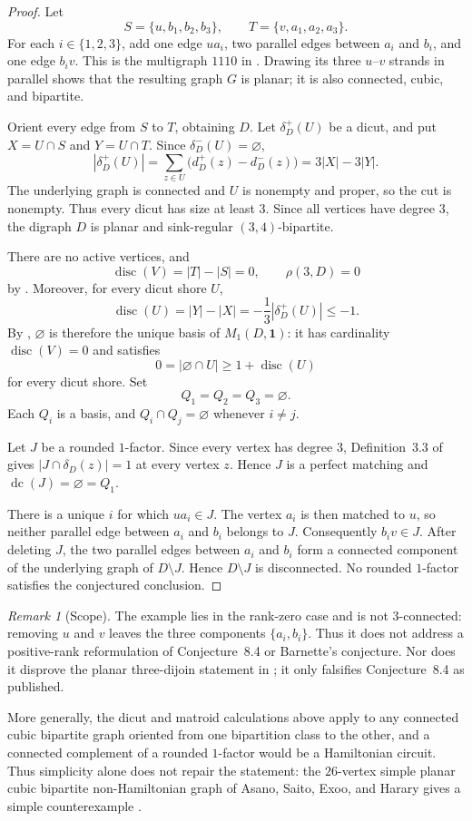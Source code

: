 \documentclass[11pt]{amsart}
\theoremstyle{remark}
\newtheorem{remark}[theorem]{Remark}
\newcommand{\disc}{\operatorname{disc}}
\newcommand{\dc}{\operatorname{dc}}
\begin{document}
\begin{proof}
Let
\[
 S=\{u,b_1,b_2,b_3\},
 \qquad
 T=\{v,a_1,a_2,a_3\}.
\]
For each $i\in\{1,2,3\}$, add one edge $ua_i$, two parallel edges
between $a_i$ and $b_i$, and one edge $b_iv$. This is the multigraph
$1110$ in \cite[Figure~3]{EH}. Drawing its three $u$--$v$ strands in
parallel shows that the resulting graph $G$ is planar; it is also
connected, cubic, and bipartite.

Orient every edge from $S$ to $T$, obtaining $D$. Let
$\delta_D^+(U)$ be a dicut, and put $X=U\cap S$ and $Y=U\cap T$.
Since $\delta_D^-(U)=\varnothing$,
\[
 |\delta_D^+(U)|
 =\sum_{z\in U}\bigl(d_D^+(z)-d_D^-(z)\bigr)
 =3|X|-3|Y|.
\]
The underlying graph is connected and $U$ is nonempty and proper, so
the cut is nonempty. Thus every dicut has size at least $3$. Since
all vertices have degree $3$, the digraph $D$ is planar and
sink-regular $(3,4)$-bipartite.

There are no active vertices, and
\[
 \disc(V)=|T|-|S|=0,
 \qquad
 \rho(3,D)=0
\]
by \cite[Lemma~3.7(1)]{ACZ}. Moreover, for every dicut shore $U$,
\[
 \disc(U)=|Y|-|X|
 =-\frac{1}{3}|\delta_D^+(U)|\le -1.
\]
By \cite[Definition~4.7]{ACZ}, $\varnothing$ is therefore the unique
basis of $M_1(D,\mathbf{1})$: it has cardinality $\disc(V)=0$ and
satisfies
\[
 0=|\varnothing\cap U|\ge 1+\disc(U)
\]
for every dicut shore. Set
\[
 Q_1=Q_2=Q_3=\varnothing.
\]
Each $Q_i$ is a basis, and $Q_i\cap Q_j=\varnothing$ whenever
$i\ne j$.

Let $J$ be a rounded $1$-factor. Since every vertex has degree $3$,
Definition~3.3 of \cite{ACZ} gives $|J\cap\delta_D(z)|=1$ at every
vertex $z$. Hence $J$ is a perfect matching and
$\dc(J)=\varnothing=Q_1$.

There is a unique $i$ for which $ua_i\in J$. The vertex $a_i$ is
then matched to $u$, so neither parallel edge between $a_i$ and $b_i$
belongs to $J$. Consequently $b_iv\in J$. After deleting $J$, the
two parallel edges between $a_i$ and $b_i$ form a connected component
of the underlying graph of $D\setminus J$. Hence $D\setminus J$ is
disconnected. No rounded $1$-factor satisfies the conjectured
conclusion.
\end{proof}

\begin{remark}[Scope]
The example lies in the rank-zero case and is not $3$-connected:
removing $u$ and $v$ leaves the three components $\{a_i,b_i\}$.
Thus it does not address a positive-rank reformulation of
Conjecture~8.4 or Barnette's conjecture. Nor does it disprove the
planar three-dijoin statement in \cite[Theorem~8.5]{ACZ}; it only
falsifies Conjecture~8.4 as published.

More generally, the dicut and matroid calculations above apply to any
connected cubic bipartite graph oriented from one bipartition class to
the other, and a connected complement of a rounded $1$-factor would
be a Hamiltonian circuit. Thus simplicity alone does not repair the
statement: the $26$-vertex simple planar cubic bipartite
non-Hamiltonian graph of Asano, Saito, Exoo, and Harary gives a simple
counterexample \cite{ASEH}.
\end{remark}
\end{document}

